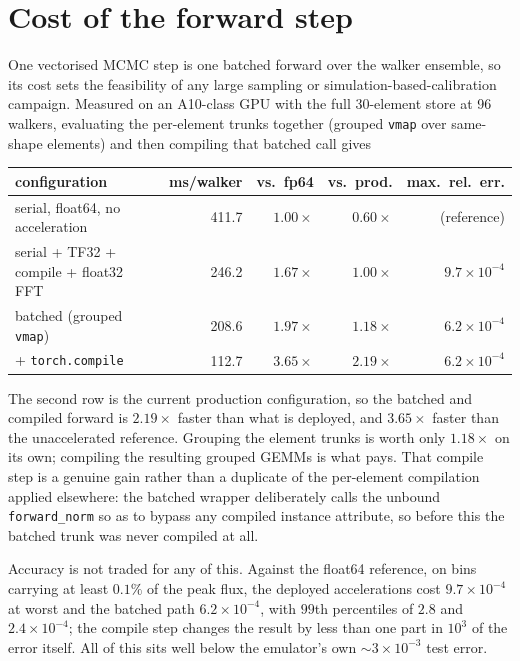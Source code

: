 \documentclass[11pt,a4paper]{article}
\newcommand{\code}[1]{\texttt{#1}}
\begin{document}
\section{Cost of the forward step}\label{sec:forwardcost}
One vectorised MCMC step is one batched forward over the walker ensemble, so its
cost sets the feasibility of any large sampling or simulation-based-calibration
campaign. Measured on an A10-class GPU with the full 30-element store at 96
walkers, evaluating the per-element trunks together (grouped \code{vmap} over
same-shape elements) and then compiling that batched call gives
\begin{center}
\begin{tabular}{lrrrr}
\toprule
configuration & ms/walker & vs.\ fp64 & vs.\ prod. & max.\ rel.\ err. \\
\midrule
serial, float64, no acceleration        & 411.7 & $1.00\times$ & $0.60\times$ & (reference) \\
serial + TF32 + compile + float32 FFT   & 246.2 & $1.67\times$ & $1.00\times$ & $9.7\times10^{-4}$ \\
batched (grouped \code{vmap})           & 208.6 & $1.97\times$ & $1.18\times$ & $6.2\times10^{-4}$ \\
\quad + \code{torch.compile}            & 112.7 & $3.65\times$ & $2.19\times$ & $6.2\times10^{-4}$ \\
\bottomrule
\end{tabular}
\end{center}
The second row is the current production configuration, so the batched and
compiled forward is $2.19\times$ faster than what is deployed, and
$3.65\times$ faster than the unaccelerated reference. Grouping the element
trunks is worth only $1.18\times$ on its own; compiling the resulting grouped
GEMMs is what pays. That compile step is a genuine gain rather than a duplicate
of the per-element compilation applied elsewhere: the batched wrapper
deliberately calls the unbound \code{forward\_norm} so as to bypass any compiled
instance attribute, so before this the batched trunk was never compiled at all.

Accuracy is not traded for any of this. Against the float64 reference, on bins
carrying at least $0.1\%$ of the peak flux, the deployed accelerations cost
$9.7\times10^{-4}$ at worst and the batched path $6.2\times10^{-4}$, with $99$th
percentiles of $2.8$ and $2.4\times10^{-4}$; the compile step changes the result
by less than one part in $10^{3}$ of the error itself. All of this sits well
below the emulator's own ${\sim}3\times10^{-3}$ test error.
\end{document}
